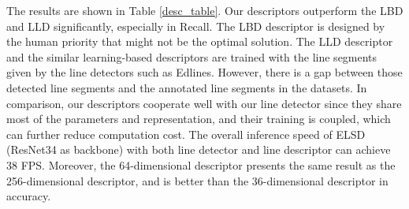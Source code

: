 \documentclass[10pt,twocolumn,letterpaper]{article}
\begin{document}
The results are shown in Table \ref{desc_table}. Our descriptors outperform the LBD and LLD significantly, especially in Recall. 
The LBD descriptor is designed by the human priority that might not be the optimal solution. The LLD descriptor and the similar learning-based descriptors\cite{WLD,DLD} are trained with the line segments given by the line detectors such as Edlines\cite{edline}. However, there is a gap between those detected line segments and the annotated line segments in the datasets\cite{York,wireframe_cvpr18}.
In comparison, our descriptors cooperate well with our line detector since they share most of the parameters and representation, and their training is coupled, which can further reduce computation cost. The overall inference speed of ELSD (ResNet34 as backbone) with both line detector and line descriptor can achieve 38 FPS. Moreover, the 64-dimensional descriptor presents the same result as the 256-dimensional descriptor, and is better than the 36-dimensional descriptor in accuracy.
\begin{table}[]
\begin{center}
\end{center}
\caption{The precision, recall and F-Score for LBD, LLD, and Ours with different dimension.}
\label{desc_table}
\end{table}
\end{document}
